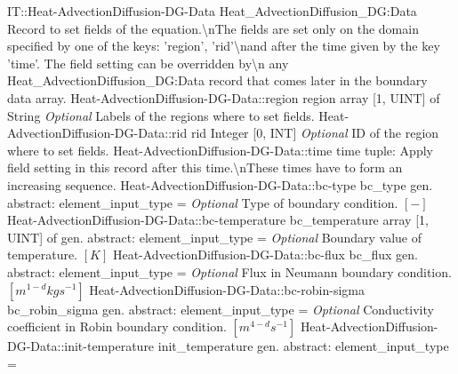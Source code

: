 \begin{RecordType}
	{IT::Heat-AdvectionDiffusion-DG-Data}
	{Heat{\_}AdvectionDiffusion{\_}DG:Data}
	{}%
	{}%
	{{{Record to set fields of the equation.{\textbackslash}nThe fields are set only on the domain specified by one of the keys: 'region', 'rid'{\textbackslash}nand after the time given by the key 'time'. The field setting can be overridden by{\textbackslash}n any Heat{\_}AdvectionDiffusion{\_}DG:Data record that comes later in the boundary data array.}%
}}
		\RecKey
			{Heat-AdvectionDiffusion-DG-Data::region}
			{region}
			{{array [1, UINT] of }{String}}{}
			{ \it{Optional}}
			{{{Labels of the regions where to set fields. }%
}}
		\RecKey
			{Heat-AdvectionDiffusion-DG-Data::rid}
			{rid}
			{{Integer [0, INT]}}{}
			{ \it{Optional}}
			{{{ID of the region where to set fields.}%
}}
		\RecKey
			{Heat-AdvectionDiffusion-DG-Data::time}
			{time}
			{{tuple: }}{}
			{ }
			{{{Apply field setting in this record after this time.{\textbackslash}nThese times have to form an increasing sequence.}%
}}
		\RecKey
			{Heat-AdvectionDiffusion-DG-Data::bc-type}
			{bc{\_}type}
			{{gen. abstract: }}{{element{\_}input{\_}type}{ = }}
			{ \it{Optional}}
			{{{Type of boundary condition. }{$[-]$}%
}}
		\RecKey
			{Heat-AdvectionDiffusion-DG-Data::bc-temperature}
			{bc{\_}temperature}
			{{array [1, UINT] of }{gen. abstract: }}{{element{\_}input{\_}type}{ = }}
			{ \it{Optional}}
			{{{Boundary value of temperature. }{$[K]$}%
}}
		\RecKey
			{Heat-AdvectionDiffusion-DG-Data::bc-flux}
			{bc{\_}flux}
			{{gen. abstract: }}{{element{\_}input{\_}type}{ = }}
			{ \it{Optional}}
			{{{Flux in Neumann boundary condition. }{$[m^{1-d}kgs^{-1}]$}%
}}
		\RecKey
			{Heat-AdvectionDiffusion-DG-Data::bc-robin-sigma}
			{bc{\_}robin{\_}sigma}
			{{gen. abstract: }}{{element{\_}input{\_}type}{ = }}
			{ \it{Optional}}
			{{{Conductivity coefficient in Robin boundary condition. }{$[m^{4-d}s^{-1}]$}%
}}
		\RecKey
			{Heat-AdvectionDiffusion-DG-Data::init-temperature}
			{init{\_}temperature}
			{{gen. abstract: }}{{element{\_}input{\_}type}{ = }}

\end{RecordType}
